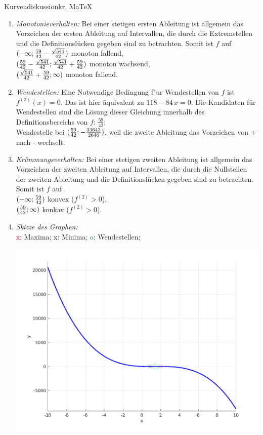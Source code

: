\begin{MAufgabe}{Kurvendiskussion}{kr, MaTeX}
\begin{enumerate}
 \item \emph{Monotonieverhalten:} 
 Bei einer stetigen ersten Ableitung ist allgemein das Vorzeichen der ersten Ableitung auf Intervallen, die durch die Extremstellen und die Definitionsl\"ucken gegeben sind zu betrachten. Somit ist $f$ auf \\ 
 $(-\infty;\frac{59}{42} - \frac{\sqrt{541}}{42})$ monoton fallend, \\ 
 $(\frac{59}{42} - \frac{\sqrt{541}}{42};\frac{\sqrt{541}}{42} + \frac{59}{42})$ monoton  wachsend, \\ 
 $(\frac{\sqrt{541}}{42} + \frac{59}{42}; \infty)$ monoton fallend. \\ 
 \item \emph{Wendestellen:} 
 Eine Notwendige Bedingung f"ur Wendestellen von $f$ ist $f^{(2)}(x)=0$. 
 Das ist hier \"aquivalent zu $118 - 84\, x=0$. 
 Die Kandidaten f\"ur Wendestellen sind die L\"osung dieser Gleichung innerhalb des Definitionsbereichs von $f$: $\frac{59}{42}$; \\ 
 Wendestelle bei $(\frac{59}{42};- \frac{33643}{2646})$, weil die zweite Ableitung das Vorzeichen von + nach - wechselt. \\ 
 \item \emph{Kr\"ummungsverhalten:} 
 Bei einer stetigen zweiten Ableitung ist allgemein das Vorzeichen der zweiten Ableitung auf Intervallen, die durch die Nullstellen der zweiten Ableitung und die Definitionsl\"ucken gegeben sind zu betrachten. 
 Somit ist $f$ auf \\ 
 $(-\infty ;\frac{59}{42})$  konvex ($f^{(2)}>0$), \\ 
 $(\frac{59}{42}; \infty)$  konkav ($f^{(2)}>0$). \\ 
 \item \emph{Skizze des Graphen:} \\ 
 {\textcolor{red} x}: Maxima; {\textcolor{black} x}: Minima; {\textcolor{green} o}: Wendestellen; 
  \begin{center}
  \includegraphics[width=0.8\linewidth]{Abb_zur_Ag_autogenerated_fractions_16.png} \end{center}
  
 \end{enumerate}
 \else\relax\fi
  \end{MAufgabe}